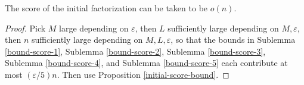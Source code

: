 \begin{proposition}
\label{initial-score}
\leanok
The score of the initial factorization can be taken to be $o(n)$.
\end{proposition}
\begin{proof}
\leanok
Pick $M$ large depending on $\varepsilon$, then $L$ sufficiently large depending
  on $M, \varepsilon$, then $n$ sufficiently large depending on $M,L,\varepsilon$, so that the
  bounds in Sublemma \ref{bound-score-1}, Sublemma \ref{bound-score-2},
  Sublemma \ref{bound-score-3}, Sublemma \ref{bound-score-4}, and Sublemma \ref{bound-score-5}
  each contribute at most $(\varepsilon/5) n$.  Then use Proposition \ref{initial-score-bound}.
\end{proof}
